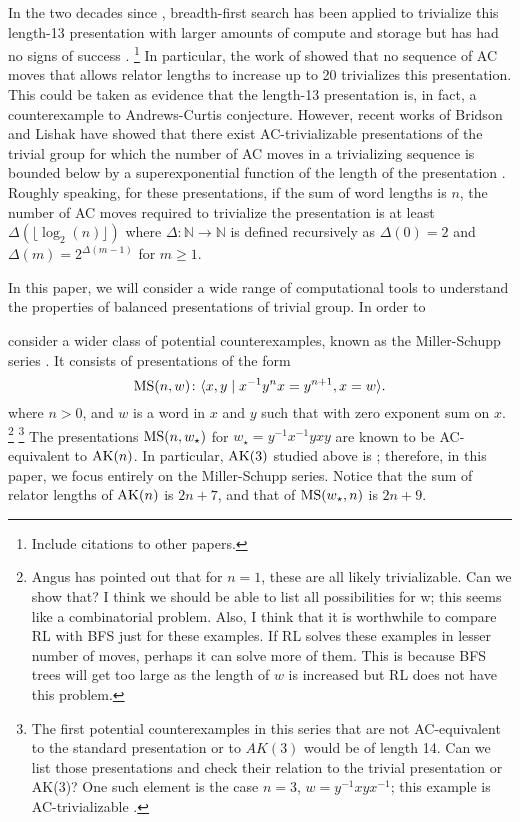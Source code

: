 In the two decades since \cite{genetic, bfs-ac}, breadth-first search has been applied to trivialize this length-13 presentation with larger amounts of compute and storage but has had no signs of success \cite{Panteleev-Ushakov}. 
\footnote{Include citations to other papers.}
In particular, the work of \cite{Panteleev-Ushakov} showed that no sequence of AC moves that allows relator lengths to increase up to 20 trivializes this presentation. This could be taken as  evidence that the length-13 presentation is, in fact, a counterexample to Andrews-Curtis conjecture. However, recent works of Bridson and Lishak have showed that there exist AC-trivializable presentations of the trivial group for which the number of AC moves in a trivializing sequence is bounded below by a superexponential function of the length of the presentation \cite{Bridson, Lishak}.
Roughly speaking, for these presentations, if the sum of word lengths is $n$, the number of AC moves required to trivialize the presentation is at least $\Delta (\lfloor \log_2 (n) \rfloor)$ where $\Delta \colon \mathbb{N} \to \mathbb{N}$ is defined recursively as $\Delta(0) = 2$ and $\Delta (m) = 2^{\Delta(m-1)}$ for $m \geq 1$.
\newline

In this paper, we will consider a wide range of computational tools to understand the properties of balanced presentations of trivial group. In order to 

consider a wider class of potential counterexamples, known as the Miller-Schupp series \cite{Miller-Schupp}. It consists of presentations of the form
\[
\text{MS}(n, w) \colon \langle x, y \mid x^{-1} y^n x = y^{n+1}, x = w\rangle.
\]
where $n > 0$, and $w$ is a word in $x$ and $y$ such that with zero exponent sum on $x$.
\footnote{Angus has pointed out that for $n=1$, these are all likely trivializable.
Can we show that? 
I think we should be able to list all possibilities for w; this seems like a combinatorial problem.
Also, I think that it is worthwhile to compare RL with BFS just for these examples. If RL solves these examples in lesser number of moves, perhaps it can solve more of them. 
This is because BFS trees will get too large as the length of $w$ is increased but RL does not have this problem.
}
\footnote{The first potential counterexamples in this series that are not AC-equivalent to the standard presentation or to $AK(3)$ would be of length 14.
Can we list those presentations and	check their relation to the trivial presentation or AK(3)? One such element is the case $n=3$, $w = y^{-1} x y x^{-1}$; this example is AC-trivializable \cite{morse}.}
The presentations $\text{MS}(n, w_\star)$ for $w_\star = y^{-1} x^{-1} y x y$ are known to be AC-equivalent to $\text{AK}(n)$. In particular, $\text{AK}(3)$ studied above is  \cite{MMS}; therefore, in this paper, we focus entirely on the Miller-Schupp series.
Notice that the sum of relator lengths of $\text{AK}(n)$ is $2n+7$, and that of $\text{MS}(w_\star, n)$ is $2n+9$.


